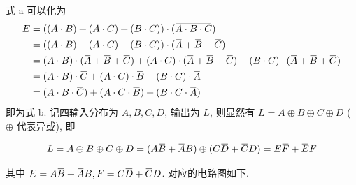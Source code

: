 \documentclass[11pt]{homework}
\newcommand{\overbar}[1]{\mkern 1.5mu\overline{\mkern-1.5mu#1\mkern-1.5mu}\mkern 1.5mu}
\begin{document}
\maketitle
\question
式 a 可以化为
\begin{align}
    \begin{aligned}
        E &= ((A\cdot B)+(A\cdot C)+(B\cdot C))\cdot(\overbar{A\cdot B\cdot C})\\
          &= ((A\cdot B)+(A\cdot C)+(B\cdot C))\cdot(\overbar{A}+\overbar{B}+\overbar{C})\\
          &= (A\cdot B)\cdot(\overbar{A}+\overbar{B}+\overbar{C})+(A\cdot C)\cdot(\overbar{A}+\overbar{B}+\overbar{C})+(B\cdot C)\cdot(\overbar{A}+\overbar{B}+\overbar{C})\\
          &= (A\cdot B)\cdot \overbar{C}+(A\cdot C)\cdot\overbar{B}+(B\cdot C)\cdot\overbar{A}\\
          &= (A\cdot B\cdot \overbar{C})+(A\cdot C\cdot\overbar{B})+(B\cdot C\cdot\overbar{A})
    \end{aligned}
\end{align}
即为式 b.
\question
记四输入分布为 $A, B, C, D$, 输出为 $L$, 则显然有 $L=A\oplus B\oplus C\oplus D$ ($\oplus$ 代表异或), 即

\begin{equation}
    L=A\oplus B\oplus C\oplus D=(A\overbar{B}+\overbar{A}B)\oplus (C\overbar{D}+\overbar{C}D)=E\overbar{F}+\overbar{E}F
\end{equation}

其中 $E = A\overbar{B}+\overbar{A}B, F = C\overbar{D}+\overbar{C}D$. 对应的电路图如下.
\end{document}
